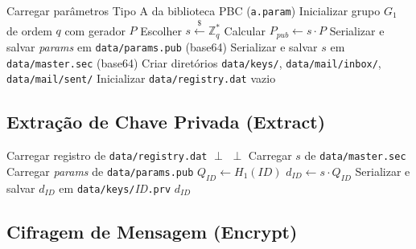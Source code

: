 \begin{algorithm}[H]
\caption{IBE Mail -- Setup}
\begin{algorithmic}[1]
  \State Carregar parâmetros Tipo A da biblioteca PBC (\texttt{a.param})
  \State Inicializar grupo $G_1$ de ordem $q$ com gerador $P$
  \State Escolher $s \xleftarrow{\$} \mathbb{Z}_q^*$ 
  \State Calcular $P_{\mathit{pub}} \leftarrow s \cdot P$
  \State Serializar e salvar \textit{params} em \texttt{data/params.pub} (base64)
  \State Serializar e salvar $s$ em \texttt{data/master.sec} (base64)
  \State Criar diretórios \texttt{data/keys/}, \texttt{data/mail/inbox/}, \texttt{data/mail/sent/}
  \State Inicializar \texttt{data/registry.dat} vazio
\EndProcedure
\end{algorithmic}
\end{algorithm}

\subsection{Extração de Chave Privada (Extract)}

\begin{algorithm}[H]
\caption{IBE Mail -- Extract}
\begin{algorithmic}[1]
  \State Carregar registro de \texttt{data/registry.dat}
    \Return $\perp$
  \EndIf
    \Return $\perp$ 
  \EndIf
  \State Carregar $s$ de \texttt{data/master.sec}
  \State Carregar \textit{params} de \texttt{data/params.pub}
  \State $Q_{\mathit{ID}} \leftarrow H_1(\mathit{ID})$ 
  \State $d_{\mathit{ID}} \leftarrow s \cdot Q_{\mathit{ID}}$
  \State Serializar e salvar $d_{\mathit{ID}}$ em \texttt{data/keys/}\textit{ID}\texttt{.prv}
  \Return $d_{\mathit{ID}}$
\EndProcedure
\end{algorithmic}
\end{algorithm}

\subsection{Cifragem de Mensagem (Encrypt)}

